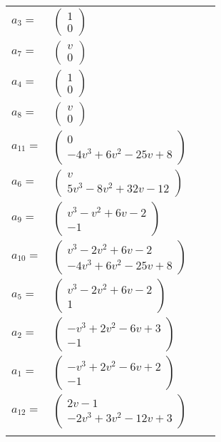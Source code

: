 \documentclass[1p]{elsarticle_modified}
\theoremstyle{definition}
\begin{document}
\begin{tabular}{m{7pt} m{180pt} m{7pt} m{180pt} }
\flushright $a_{3}=$&$\begin{pmatrix}1\\0\end{pmatrix}$ \\
\flushright $a_{7}=$&$\begin{pmatrix}v\\0\end{pmatrix}$ \\
\flushright $a_{4}=$&$\begin{pmatrix}1\\0\end{pmatrix}$ \\
\flushright $a_{8}=$&$\begin{pmatrix}v\\0\end{pmatrix}$ \\
\flushright $a_{11}=$&$\begin{pmatrix}0\\-4 v^3+6 v^2-25 v+8\end{pmatrix}$ \\
\flushright $a_{6}=$&$\begin{pmatrix}v\\5 v^3-8 v^2+32 v-12\end{pmatrix}$ \\
\flushright $a_{9}=$&$\begin{pmatrix}v^3- v^2+6 v-2\\-1\end{pmatrix}$ \\
\flushright $a_{10}=$&$\begin{pmatrix}v^3-2 v^2+6 v-2\\-4 v^3+6 v^2-25 v+8\end{pmatrix}$ \\
\flushright $a_{5}=$&$\begin{pmatrix}v^3-2 v^2+6 v-2\\1\end{pmatrix}$ \\
\flushright $a_{2}=$&$\begin{pmatrix}- v^3+2 v^2-6 v+3\\-1\end{pmatrix}$ \\
\flushright $a_{1}=$&$\begin{pmatrix}- v^3+2 v^2-6 v+2\\-1\end{pmatrix}$ \\
\flushright $a_{12}=$&$\begin{pmatrix}2 v-1\\-2 v^3+3 v^2-12 v+3\end{pmatrix}$\\&\end{tabular}
\end{document}
